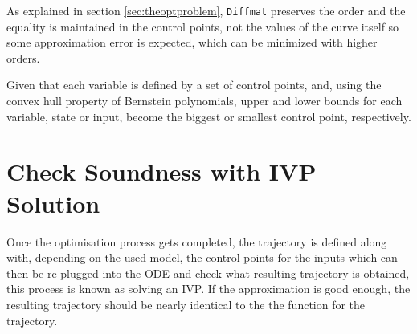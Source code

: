 \par As explained in section \ref{sec:theoptproblem}, \texttt{Diffmat} preserves the order and the equality is maintained in the control points, not the values of the curve itself so some approximation error is expected, which can be minimized with higher orders.

\par Given that each variable is defined by a set of control points, and, using the convex hull property of Bernstein polynomials, upper and lower bounds for each variable, state or input, become the biggest or smallest control point, respectively.

\section{Check Soundness with IVP Solution}
\label{sec:ivproblem}

\par Once the optimisation process gets completed, the trajectory is defined along with, depending on the used model, the control points for the inputs which can then be re-plugged into the \ac{ODE} and check what resulting trajectory is obtained, this process is known as solving an \ac{IVP}. If the approximation is good enough, the resulting trajectory should be nearly identical to the the function for the trajectory. 

